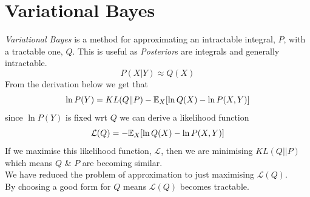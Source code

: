 \documentclass[11pt,a4paper]{article}
\begin{document}
\newcommand{\definition}[1]{\stepcounter{definition} \textbf{Definition \arabic{section}.\arabic{definition}\ - }\textit{#1}\\}
\newcommand{\definitionn}[1]{\stepcounter{definition} \textbf{Definition \arabic{section}.\arabic{definition}\ - }\textit{#1}}
\newcommand{\proof}[1]{\stepcounter{proof} \textbf{Proof \arabic{section}.\arabic{proof}\ - }\textit{#1}\\}
\newcommand{\prooff}[1]{\stepcounter{proof} \textbf{Proof \arabic{section}.\arabic{proof}\ - }\textit{#1}}
\newcommand{\example}[1]{\stepcounter{example} \textbf{Example \arabic{section}.\arabic{example}\ - }\textit{#1}\\}
\newcommand{\examplee}[1]{\stepcounter{example} \textbf{Example \arabic{section}.\arabic{example}\ - }\textit{#1}}
\newcommand{\notation}[1]{\stepcounter{notation} \textbf{Notation \arabic{section}.\arabic{notation}\ - }\textit{#1}\\}
\newcommand{\notationn}[1]{\stepcounter{notation} \textbf{Notation \arabic{section}.\arabic{notation}\ - }\textit{#1}}
\newcommand{\proposition}[1]{\stepcounter{proposition} \textbf{Proposition \arabic{section}.\arabic{proposition}\ - }\textit{#1}\\}
\newcommand{\propositionn}[1]{\stepcounter{proposition} \textbf{Proposition \arabic{section}.\arabic{proposition}\ - }\textit{#1}}
\newcommand{\remark}[1]{\stepcounter{remark} \textbf{Remark \arabic{section}.\arabic{remark}\ - }\textit{#1}\\}
\newcommand{\remarkk}[1]{\stepcounter{remark} \textbf{Remark \arabic{section}.\arabic{remark}\ - }\textit{#1}}
\newcommand{\theorem}[1]{\stepcounter{theorem} \textbf{Theorem \arabic{section}.\arabic{theorem}\ - }\textit{#1}\\}
\newcommand{\theoremm}[1]{\stepcounter{theorem} \textbf{Theorem \arabic{section}.\arabic{theorem}\ - }\textit{#1}}

\section{Variational Bayes}
\textit{Variational Bayes} is a method for approximating an intractable integral, $P$, with a tractable one, $Q$. This is useful as \textit{Posterior}s are integrals and generally intractable.
$$P(X|Y)\approx Q(X)$$
From the derivation below we get that
$$\ln P(Y)=KL(Q\|P)-\mathbb{E}_X[\ln Q(X)-\ln P(X,Y)]$$
since $\ln P(Y)$ is fixed wrt $Q$ we can derive a likelihood function
$$\mathcal{L}(Q)=-\mathbb{E}_X[\ln Q(X)-\ln P(X,Y)]$$
If we maximise this likelihood function, $\mathcal{L}$, then we are minimising $KL(Q||P)$ which means $Q$ \& $P$ are becoming similar.\\
We have reduced the problem of approximation to just maximising $\mathcal{L}(Q)$.\\
By choosing a good form for $Q$ means $\mathcal{L}(Q)$ becomes tractable.
\end{document}
